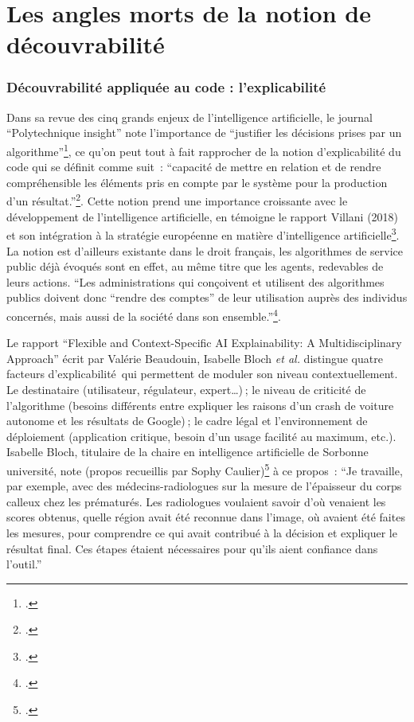 \chapter{Les angles morts de la notion de découvrabilité}

\subsection{Découvrabilité appliquée au code : l'explicabilité}

Dans sa revue des cinq grands enjeux de l’intelligence artificielle, le journal \enquote{Polytechnique insight} note l’importance de \enquote{justifier les décisions prises par un algorithme}\footcite{noauthor_nouveaux_nodate}, ce qu’on peut tout à fait rapprocher de la notion d’explicabilité du code qui se définit comme suit : \enquote{capacité de mettre en relation et de rendre compréhensible les éléments pris en compte par le système pour la production d’un résultat.}\footcite{zotero-315}. Cette notion prend une importance croissante avec le développement de l’intelligence artificielle, en témoigne le rapport Villani (2018) et son intégration à la stratégie européenne en matière d’intelligence artificielle\footcite[p. 14]{maxwell_comment_2020}. La notion est d’ailleurs existante dans le droit français, les algorithmes de service public déjà évoqués sont en effet, au même titre que les agents, redevables de leurs actions. \enquote{Les administrations qui conçoivent et utilisent des algorithmes publics doivent donc “rendre des comptes” de leur utilisation auprès des individus concernés, mais aussi de la société dans son ensemble.}\footcite{noauthor_algorithmes_nodate-1}. 

Le rapport \enquote{Flexible and Context-Specific AI Explainability: A Multidisciplinary Approach} écrit par Valérie Beaudouin, Isabelle Bloch \textit{et al.} distingue quatre facteurs d’explicabilité qui permettent de moduler son niveau contextuellement. Le destinataire (utilisateur, régulateur, expert…) ; le niveau de criticité de l’algorithme (besoins différents entre expliquer les raisons d’un crash de voiture autonome et les résultats de Google) ; le cadre légal et l’environnement de déploiement (application critique, besoin d’un usage facilité au maximum, etc.). Isabelle Bloch, titulaire de la chaire en intelligence artificielle de Sorbonne université, note (propos recueillis par Sophy Caulier)\footcite{noauthor_nouveaux_nodate} à ce propos : \enquote{Je travaille, par exemple, avec des médecins-radiologues sur la mesure de l’épaisseur du corps calleux chez les prématurés. Les radiologues voulaient savoir d’où venaient les scores obtenus, quelle région avait été reconnue dans l’image, où avaient été faites les mesures, pour comprendre ce qui avait contribué à la décision et expliquer le résultat final. Ces étapes étaient nécessaires pour qu’ils aient confiance dans l’outil.}

